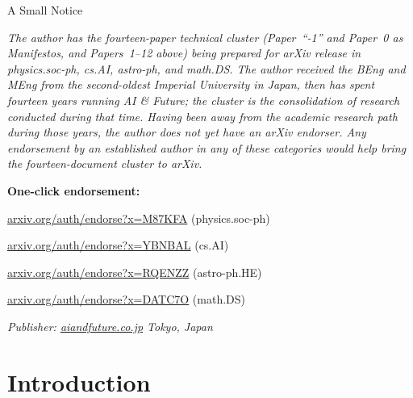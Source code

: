 \singlespacing
\begin{center}
{\fontsize{12pt}{14pt}\selectfont A Small Notice}
\end{center}
\vspace{0.125em}
\begin{center}
{\fontsize{12pt}{15pt}\selectfont\itshape The author has the fourteen-paper technical cluster (Paper~``-1'' and Paper~0 as Manifestos, and Papers~1--12 above) being prepared for arXiv release in physics.soc-ph, cs.AI, astro-ph, and math.DS. The author received the BEng and MEng from the second-oldest Imperial University in Japan, then has spent fourteen years running AI \& Future; the cluster is the consolidation of research conducted during that time. Having been away from the academic research path during those years, the author does not yet have an arXiv endorser. Any endorsement by an established author in any of these categories would help bring the fourteen-document cluster to arXiv.\par}
\vspace{1.0em}
{\fontsize{11pt}{14pt}\selectfont\bfseries One-click endorsement:\par}
\vspace{0.3em}
{\fontsize{11pt}{14pt}\selectfont \href{https://arxiv.org/auth/endorse?x=M87KFA}{arxiv.org/auth/endorse?x=M87KFA} (physics.soc-ph)\par}
{\fontsize{11pt}{14pt}\selectfont \href{https://arxiv.org/auth/endorse?x=YBNBAL}{arxiv.org/auth/endorse?x=YBNBAL} (cs.AI)\par}
{\fontsize{11pt}{14pt}\selectfont \href{https://arxiv.org/auth/endorse?x=RQENZZ}{arxiv.org/auth/endorse?x=RQENZZ} (astro-ph.HE)\par}
{\fontsize{11pt}{14pt}\selectfont \href{https://arxiv.org/auth/endorse?x=DATC7O}{arxiv.org/auth/endorse?x=DATC7O} (math.DS)\par}
\vspace{0.8em}
\vspace{0.5cm}
{\fontsize{10pt}{12pt}\selectfont\itshape Publisher: \href{https://aiandfuture.co.jp}{aiandfuture.co.jp} \quad\textbullet\quad Tokyo, Japan\par}
\end{center}
\restoregeometry
\clearpage
{}
\doublespacing

\section{Introduction}

